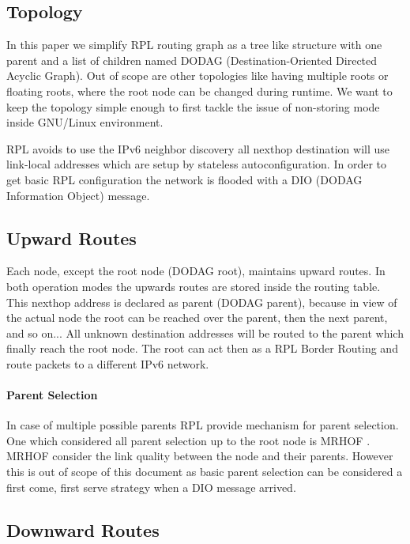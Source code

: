 \documentclass[letterpaper]{article}
\begin{document}
\subsection{Topology}

In this paper we simplify RPL routing graph as a tree like structure with one parent and a list of children named DODAG (Destination-Oriented Directed Acyclic Graph).
Out of scope are other topologies like having multiple roots or floating roots, where the root node can be changed during runtime.
We want to keep the topology simple enough to first tackle the issue of non-storing mode inside GNU/Linux environment.

RPL avoids to use the IPv6 neighbor discovery all nexthop destination will use link-local addresses which are setup by stateless autoconfiguration.
In order to get basic RPL configuration the network is flooded with a DIO (DODAG Information Object) message.

\subsection{Upward Routes}

Each node, except the root node (DODAG root), maintains upward routes.
In both operation modes the upwards routes are stored inside the routing table.
This nexthop address is declared as parent (DODAG parent), because in view of the actual node the root can be reached over the parent, then the next parent, and so on...
All unknown destination addresses will be routed to the parent which finally reach the root node.
The root can act then as a RPL Border Routing and route packets to a different IPv6 network.

\paragraph{Parent Selection}

In case of multiple possible parents RPL provide mechanism for parent selection.
One which considered all parent selection up to the root node is MRHOF \cite{RFC6719}.
MRHOF consider the link quality between the node and their parents.
However this is out of scope of this document as basic parent selection can be considered a first come, first serve strategy when a DIO message arrived.

\subsection{Downward Routes}
\end{document}
